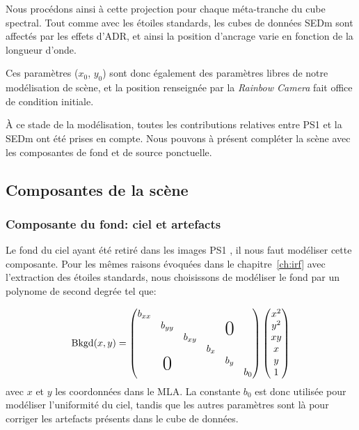 \documentclass[../main/main.tex]{subfiles}
\begin{document}
Nous procédons ainsi à cette projection pour chaque méta-tranche du cube
spectral. Tout comme avec les étoiles standards, les 
cubes de données SEDm sont affectés par les effets d'ADR, et ainsi la position d'ancrage varie en fonction de la
longueur d'onde.

Ces paramètres ($x_{0}$, $y_{0}$) sont donc également des paramètres
libres de notre modélisation de scène, et la position renseignée par la
\textit{Rainbow Camera} fait office de condition initiale.

À ce stade de la modélisation, toutes les contributions relatives entre
PS1 et la SEDm ont été prises en compte.
Nous pouvons à présent compléter la scène avec les composantes de fond
et de source ponctuelle.

\subsection{Composantes de la scène}

\subsubsection{Composante du fond: ciel et artefacts}

Le fond du ciel ayant été retiré dans les images PS1 \citep{Waters2020},
il nous faut modéliser cette composante. Pour les mêmes raisons évoquées
dans le chapitre~\ref{ch:irf} avec l'extraction des étoiles standards,
nous choisissons de modéliser le fond par un polynome de second degrée
tel que:

\begin{equation}
  \label{eq:backgroundcurved2}
  \text{Bkgd}(x,y) =
  \begin{pmatrix}
    b_{xx} &  &  &  &  & \\ 
     & b_{yy} &  &  &  \makebox(0,0){\text{\huge0}} & \\ 
     &  & b_{xy} &  & & \\
     &  &  & b_{x} &  & \\ 
     & \makebox(0,0){\text{\huge0}}  &  &  & b_{y} & \\ 
     &  &  &  &  & b_{0}\\
  \end{pmatrix}
  \begin{pmatrix}
    x^{2}\\
    y^{2}\\
    xy \\
    x \\
    y \\
    1 \\
  \end{pmatrix}
\end{equation}
avec $x$ et $y$ les coordonnées dans le MLA. La constante $b_{0}$ est
donc utilisée pour modéliser l'uniformité du ciel, tandis que les autres
paramètres sont là pour corriger les artefacts présents dans le cube de données.
\end{document}
